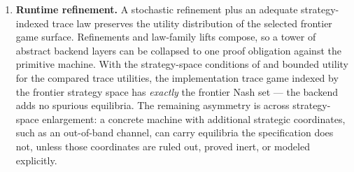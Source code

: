 \begin{enumerate}[leftmargin=1.4em,itemsep=2pt]
  deviations can be matched across the two presentations.
\item \textbf{Runtime refinement.}  A stochastic refinement plus an
  adequate strategy-indexed trace law preserves the utility distribution
  of the selected frontier game surface.  Refinements and law-family
  lifts compose, so a tower of abstract backend layers can be collapsed
  to one proof obligation against the primitive machine.  With the
  strategy-space conditions of  and bounded
  utility for the compared trace utilities, the implementation trace game
  indexed by the frontier strategy space has \emph{exactly} the frontier
  Nash set --- the backend adds no spurious equilibria.  The remaining
  asymmetry is across strategy-space enlargement: a concrete machine with
  additional strategic coordinates, such as an out-of-band channel, can
  carry equilibria the specification does not, unless those coordinates
  are ruled out, proved inert, or modeled explicitly.
\end{enumerate}

